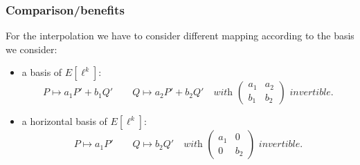 \documentclass[10pt,a4paper]{beamer}
\theoremstyle{plain}
\theoremstyle{definition}
\theoremstyle{definition}
\theoremstyle{definition}
\theoremstyle{definition}
\theoremstyle{remark}
\theoremstyle{remark}
\begin{document}
%
%
%
%
%
%
%

\begin{frame}
\frametitle{Comparison/benefits}
For the interpolation we have to consider different mapping according to the basis we consider:
\begin{itemize}
\item a basis of $E[\ell^k]$:
\[
P \mapsto a_1 P' + b_1 Q' \quad \quad Q \mapsto a_2 P' + b_2 Q' \quad \textit{with } \left( \begin{matrix}
a_1 & a_2 \\
b_1 & b_2
\end{matrix}  \right) \textit{ invertible.}
\]
\pause
\item a horizontal basis of $E[\ell^k]$:
\[
P \mapsto a_1 P' \quad \quad Q \mapsto b_2 Q' \quad \textit{with } \left( \begin{matrix}
a_1 & 0 \\
0 & b_2
\end{matrix}  \right) \textit{ invertible.}
\]
\end{itemize}
\end{frame}
\end{document}
